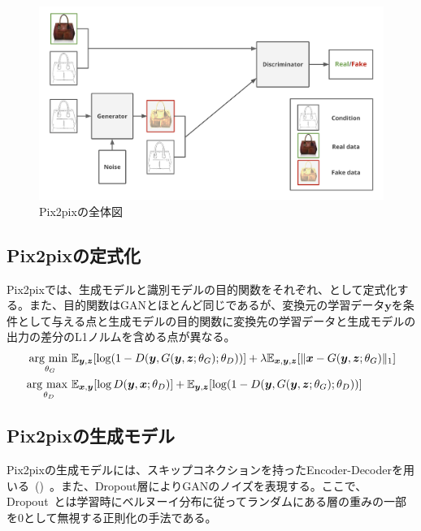 \begin{figure}[b]
\centering
\includegraphics[width=0.9\columnwidth]{figure/pix2pix_net.png}
\caption{Pix2pixの全体図}
\label{fig:pix2pix_net}
\end{figure}

\subsection{Pix2pixの定式化}

Pix2pixでは、生成モデルと識別モデルの目的関数をそれぞれ、として定式化する。また、目的関数はGANとほとんど同じであるが、変換元の学習データ$\boldsymbol{y}$を条件として与える点と生成モデルの目的関数に変換先の学習データと生成モデルの出力の差分のL1ノルムを含める点が異なる。
\begin{align}
    \label{eq:pix2pix_G}
    \mathop{\mathrm{arg~min~}}\limits _{\theta_G}& \mathbb{E}_{\boldsymbol{y}, \boldsymbol{z}}[\log (1-D(\boldsymbol{y}, G(\boldsymbol{y}, \boldsymbol{z}; \theta_G); \theta_D))]+\lambda \mathbb{E}_{\boldsymbol{x}, \boldsymbol{y}, \boldsymbol{z}}[\|\boldsymbol{x}-G(\boldsymbol{y}, \boldsymbol{z}; \theta_G)\|_{1}]\\
    \label{eq:pix2pix_D}
    \mathop{\mathrm{arg~max~}}\limits _{\theta_D}& \mathbb{E}_{\boldsymbol{x}, \boldsymbol{y}}[\log D(\boldsymbol{y}, \boldsymbol{x}; \theta_D)]+\mathbb{E}_{\boldsymbol{y}, \boldsymbol{z}}[\log (1-D(\boldsymbol{y}, G(\boldsymbol{y}, \boldsymbol{z}; \theta_G); \theta_D))]
\end{align}

\clearpage

\subsection{Pix2pixの生成モデル}

Pix2pixの生成モデルには、スキップコネクションを持ったEncoder-Decoderを用いる~()~。また、Dropout層によりGANのノイズを表現する。ここで、Dropout~\cite{Dropout}とは学習時にベルヌーイ分布に従ってランダムにある層の重みの一部を0として無視する正則化の手法である。

